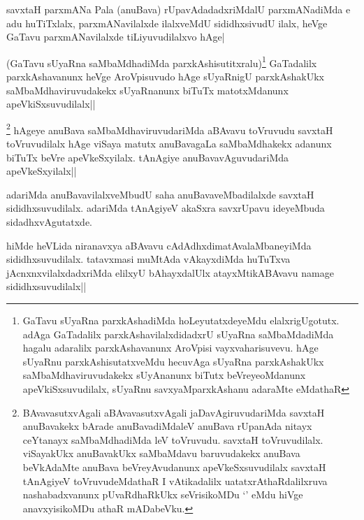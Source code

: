 \begin{artha}%
savxtaH parxmANa Pala (anuBava) rUpavAdadadxriMdalU parxmANadiMda e adu huTiTxlalx, parxmANavilalxde ilalxveMdU sididhxsivudU ilalx, heVge GaTavu parxmANavilalxde tiLiyuvudilalxvo hAge|
\end{artha}


\begin{artha}
(GaTavu sUyaRna saMbaMdhadiMda parxkAshisutitxralu)\footnote[1]{GaTavu sUyaRna parxkAshadiMda hoLeyutatxdeyeMdu elalxrigUgotutx. adAga GaTadalilx parxkAshavilalxdidadxrU sUyaRna saMbaMdadiMda hagalu adaralilx parxkAshavanunx AroVpisi vayxvaharisuvevu. hAge sUyaRnu parxkAshisutatxveMdu hecuvAga sUyaRna parxkAshakUkx saMbaMdhaviruvudakekx sUyAnanunx biTutx beVreyeoMdanunx apeVkiSxsuvudilalx, sUyaRnu savxyaMparxkAshanu adaraMte eMdathaR} GaTadalilx parxkAshavanunx heVge AroVpisuvudo hAge sUyaRnigU parxkAshakUkx saMbaMdhaviruvudakekx sUyaRnanunx biTuTx matotxMdanunx apeVkiSxsuvudilalx||
\end{artha}

\begin{artha}
\footnote[2]{BAvavasutxvAgali aBAvavasutxvAgali jaDavAgiruvudariMda savxtaH anuBavakekx bArade anuBavadiMdaleV anuBava rUpanAda nitayx ceYtanayx saMbaMdhadiMda leV toVruvudu. savxtaH toVruvudilalx. viSayakUkx anuBavakUkx saMbaMdavu baruvudakekx anuBava beVkAdaMte anuBava beVreyAvudanunx apeVkeSxsuvudilalx savxtaH tAnAgiyeV toVruvudeMdathaR I vAtikadalilx uatatxrAthaRdalilxruva nashabadxvanunx pUvaRdhaRkUkx seVrisikoMDu `\stext ' eMdu hiVge anavxyisikoMDu athaR mADabeVku.} hAgeye anuBava saMbaMdhaviruvudariMda aBAvavu toVruvudu savxtaH toVruvudilalx hAge viSaya matutx anuBavagaLa saMbaMdhakekx adanunx biTuTx beVre apeVkeSxyilalx. tAnAgiye anuBavavAguvudariMda apeVkeSxyilalx||
\end{artha}

\begin{artha}
adariMda anuBavavilalxveMbudU saha anuBavaveMbadilalxde savxtaH sididhxsuvudilalx. adariMda tAnAgiyeV akaSxra savxrUpavu ideyeMbuda sidadhxvAgutatxde.
\end{artha}

\begin{artha}%
hiMde heVLida niranavxya aBAvavu cAdAdhxdimatAvalaMbaneyiMda sididhxsuvudilalx. tatavxmasi muMtAda vAkayxdiMda huTuTxva jAcnxnxvilalxdadxriMda elilxyU bAhayxdalUlx atayxMtikABAvavu namage sididhxsuvudilalx||
\end{artha}

